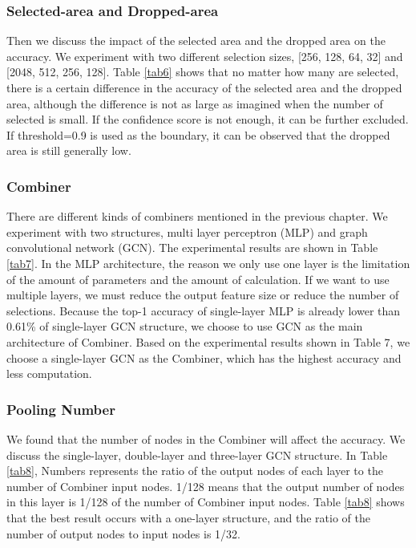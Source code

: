 \documentclass[conference]{IEEEtran}
\begin{document}
\subsubsection{Selected-area and Dropped-area}

Then we discuss the impact of the selected area and the dropped area on the accuracy. We experiment with two different selection sizes, [256, 128, 64, 32] and [2048, 512, 256, 128]. Table \ref{tab6} shows that no matter how many are selected, there is a certain difference in the accuracy of the selected area and the dropped area, although the difference is not as large as imagined when the number of selected is small. If the confidence score is not enough, it can be further excluded. If threshold=0.9 is used as the boundary, it can be observed that the dropped area is still generally low.

\subsubsection{Combiner}

There are different kinds of combiners mentioned in the previous chapter. We experiment with two structures, multi layer perceptron (MLP) and graph convolutional network (GCN). The experimental results are shown in Table \ref{tab7}. In the MLP architecture, the reason we only use one layer is the limitation of the amount of parameters and the amount of calculation. If we want to use multiple layers, we must reduce the output feature size or reduce the number of selections. Because the top-1 accuracy of single-layer MLP is already lower than 0.61\% of single-layer GCN structure, we choose to use GCN as the main architecture of Combiner. Based on the experimental results shown in Table 7, we choose a single-layer GCN as the Combiner, which has the highest accuracy and less computation.

\subsubsection{Pooling Number}

We found that the number of nodes in the Combiner will affect the accuracy. We discuss the single-layer, double-layer and three-layer GCN structure. In Table \ref{tab8}, Numbers represents the ratio of the output nodes of each layer to the number of Combiner input nodes. 1/128 means that the output number of nodes in this layer is 1/128 of the number of Combiner input nodes. Table \ref{tab8} shows that the best result occurs with a one-layer structure, and the ratio of the number of output nodes to input nodes is 1/32. 
\end{document}
